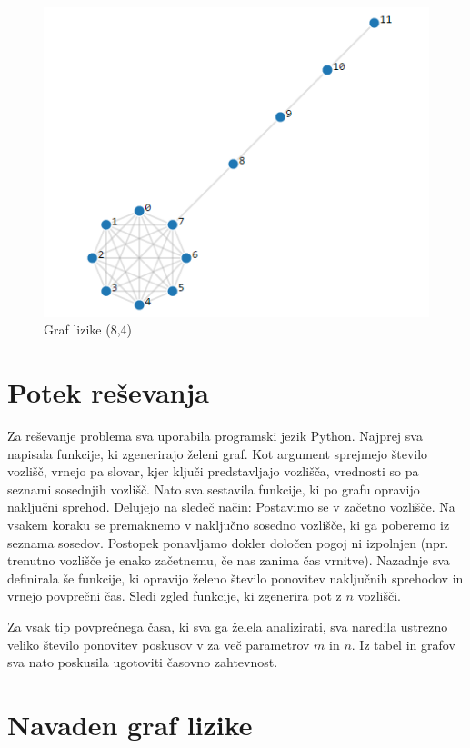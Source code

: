 \documentclass[12pt,a4paper]{amsart}
\begin{document}
\begin{figure}[h]
    \includegraphics[width=\textwidth]{Lollipop_graph.png}
    \caption{Graf lizike (8,4)}
\end{figure}

\section{Potek reševanja}
Za reševanje problema sva uporabila programski jezik Python. Najprej sva napisala funkcije, ki zgenerirajo želeni graf.
Kot argument sprejmejo število vozlišč, vrnejo pa slovar, kjer ključi predstavljajo vozlišča, vrednosti so pa seznami
sosednjih vozlišč. Nato sva sestavila funkcije, ki po grafu opravijo naključni sprehod. Delujejo na sledeč način: 
Postavimo se v začetno vozlišče. Na vsakem koraku se premaknemo v naključno sosedno vozlišče, ki ga poberemo iz
seznama sosedov. Postopek ponavljamo dokler določen pogoj ni izpolnjen (npr. trenutno vozlišče je enako začetnemu,
če nas zanima čas vrnitve). Nazadnje sva definirala še funkcije, ki opravijo želeno število ponovitev naključnih sprehodov
in vrnejo povprečni čas. Sledi zgled funkcije, ki zgenerira pot z  $n$ vozlišči.


Za vsak tip povprečnega časa, ki sva ga želela analizirati, sva naredila ustrezno veliko število ponovitev poskusov v
za več parametrov $m$ in $n$. Iz tabel in grafov sva nato poskusila ugotoviti časovno zahtevnost.

\section{Navaden graf lizike}
\end{document}
